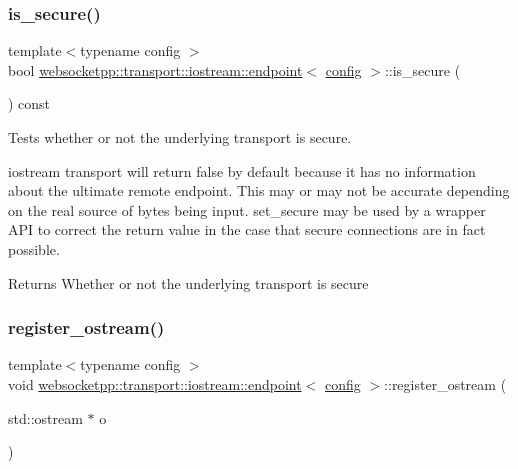 \subsubsection{\texorpdfstring{is\+\_\+secure()}{is\_secure()}}
{\footnotesize\ttfamily template$<$typename config $>$ \\
bool \mbox{\hyperlink{classwebsocketpp_1_1transport_1_1iostream_1_1endpoint}{websocketpp\+::transport\+::iostream\+::endpoint}}$<$ \mbox{\hyperlink{classconfig}{config}} $>$\+::is\+\_\+secure (\begin{DoxyParamCaption}{ }\end{DoxyParamCaption}) const\hspace{0.3cm}{\ttfamily [inline]}}



Tests whether or not the underlying transport is secure. 

iostream transport will return false by default because it has no information about the ultimate remote endpoint. This may or may not be accurate depending on the real source of bytes being input. {\ttfamily set\+\_\+secure} may be used by a wrapper A\+PI to correct the return value in the case that secure connections are in fact possible.

\begin{DoxyReturn}{Returns}
Whether or not the underlying transport is secure 
\end{DoxyReturn}
\mbox{\label{classwebsocketpp_1_1transport_1_1iostream_1_1endpoint_ad6db3b10406e568befba8e00ae8b6ac4}} 
\subsubsection{\texorpdfstring{register\+\_\+ostream()}{register\_ostream()}}
{\footnotesize\ttfamily template$<$typename config $>$ \\
void \mbox{\hyperlink{classwebsocketpp_1_1transport_1_1iostream_1_1endpoint}{websocketpp\+::transport\+::iostream\+::endpoint}}$<$ \mbox{\hyperlink{classconfig}{config}} $>$\+::register\+\_\+ostream (\begin{DoxyParamCaption}\item[{std\+::ostream $\ast$}]{o }\end{DoxyParamCaption})\hspace{0.3cm}{\ttfamily [inline]}}



